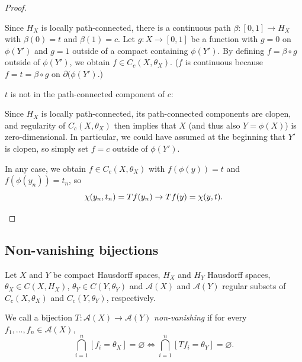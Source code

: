 \begin{proof}
\begin{description}
\begin{description}
Since $H_X$ is locally path-connected, there is a continuous path $\beta:[0,1]\to H_X$ with $\beta(0)=t$ and $\beta(1)=c$. Let $g:X\to[0,1]$ be a function with $g=0$ on $\phi(Y')$ and $g=1$ outside of a compact containing $\phi(Y')$. By defining $f=\beta\circ g$ outside of $\phi(Y')$, we obtain $f\in C_c(X,\theta_X)$. ($f$ is continuous because $f=t=\beta\circ g$ on $\partial(\phi(Y')$.)
\item[Case 2:] $t$ is not in the path-connected component of $c$:

Since $H_X$ is locally path-connected, its path-connected components are clopen, and regularity of $C_c(X,\theta_X)$ then implies that $X$ (and thus also $Y=\phi(X)$) is zero-dimensional. In particular, we could have assumed at the beginning that $Y'$ is clopen, so simply set $f=c$ outside of $\phi(Y')$.
\end{description}

In any case, we obtain $f\in C_c(X,\theta_X)$ with $f(\phi(y))=t$ and $f(\phi(y_n))=t_n$, so
\[\chi(y_n,t_n)=Tf(y_n)\to Tf(y)=\chi(y,t).\qedhere\]
\end{description}
\end{proof}

\subsection{Non-vanishing bijections}

Let $X$ and $Y$ be compact Hausdorff spaces, $H_X$ and $H_Y$ Hausdorff spaces, $\theta_X\in C(X,H_X)$, $\theta_Y\in C(Y,\theta_Y)$ and $\mathcal{A}(X)$ and $\mathcal{A}(Y)$ regular subsets of $C_c(X,\theta_X)$ and $C_c(Y,\theta_Y)$, respectively.

\begin{definition}[\cite{MR2324919}]\label{definitionnonvanishingbijection}
We call a bijection $T:\mathcal{A}(X)\to\mathcal{A}(Y)$ \emph{non-vanishing} if for every $f_1,\ldots,f_n\in\mathcal{A}(X)$,
\[\bigcap_{i=1}^n[f_i=\theta_X]=\varnothing\iff\bigcap_{i=1}^n[Tf_i=\theta_Y]=\varnothing.\]
\end{definition}

